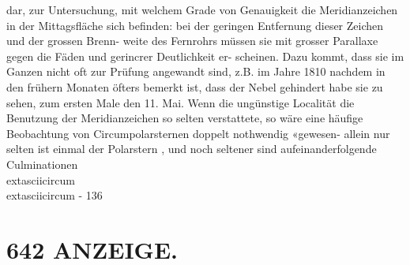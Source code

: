 \documentclass[12pt,a4paper]{article}
\begin{document}
{{{{{{{{dar,  zur  Untersuchung,  mit  welchem  Grade  von  Genauigkeit  die  Meridianzeichen  in der  Mittagsfläche  sich  befinden:  bei  der  geringen  Entfernung  dieser  Zeichen  und  der  grossen  Brenn- weite des  Fernrohrs  müssen  sie  mit  grosser  Parallaxe  gegen  die  Fäden  und  gerincrer  Deutlichkeit  er- scheinen. Dazu  kommt,  dass  sie  im  Ganzen  nicht  oft  zur  Prüfung  angewandt  sind,  z.B.  im  Jahre  1810 nachdem  in  den  frühern  Monaten  öfters  bemerkt  ist,  dass  der  Nebel  gehindert  habe  sie  zu  sehen,  zum ersten  Male  den  11.  Mai.  Wenn  die  ungünstige  Localität  die  Benutzung  der  Meridianzeichen  so  selten verstattete,  so  wäre  eine  häufige  Beobachtung  von  Circumpolarsternen  doppelt  nothwendig  «gewesen- allein  nur  selten  ist  einmal  der  Polarstern ,   und  noch   seltener  sind  aufeinanderfolgende  Culminationen \\	extasciicircum{}{ }{ }\\	extasciicircum{}{ }{ }-  136


\section*{642  ANZEIGE.}

}}}}}}}}
\end{document}
